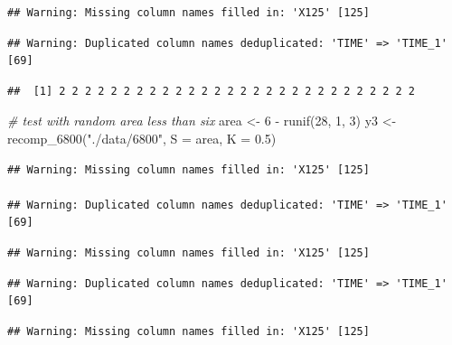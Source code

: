 \documentclass[
]{krantz}
\makeatletter
\newenvironment{Shaded}{\begin{snugshade}}{\end{snugshade}}
\newcommand{\AttributeTok}[1]{\textcolor[rgb]{0.77,0.63,0.00}{#1}}
\newcommand{\CommentTok}[1]{\textcolor[rgb]{0.56,0.35,0.01}{\textit{#1}}}
\newcommand{\DecValTok}[1]{\textcolor[rgb]{0.00,0.00,0.81}{#1}}
\newcommand{\FloatTok}[1]{\textcolor[rgb]{0.00,0.00,0.81}{#1}}
\newcommand{\FunctionTok}[1]{\textcolor[rgb]{0.00,0.00,0.00}{#1}}
\newcommand{\NormalTok}[1]{#1}
\newcommand{\OtherTok}[1]{\textcolor[rgb]{0.56,0.35,0.01}{#1}}
\newcommand{\SpecialCharTok}[1]{\textcolor[rgb]{0.00,0.00,0.00}{#1}}
\newcommand{\StringTok}[1]{\textcolor[rgb]{0.31,0.60,0.02}{#1}}
\newenvironment{kframe}{%
\medskip{}
\setlength{\fboxsep}{.8em}
 \def\at@end@of@kframe{}%
 \ifinner\ifhmode%
  \def\at@end@of@kframe{\end{minipage}}%
  \begin{minipage}{\columnwidth}%
 \fi\fi%
 \def\FrameCommand##1{\hskip\@totalleftmargin \hskip-\fboxsep
 \colorbox{shadecolor}{##1}\hskip-\fboxsep
     \hskip-\linewidth \hskip-\@totalleftmargin \hskip\columnwidth}%
 \MakeFramed {\advance\hsize-\width
   \@totalleftmargin\z@ \linewidth\hsize
   \@setminipage}}%
 {\par\unskip\endMakeFramed%
 \at@end@of@kframe}
\renewenvironment{Shaded}{\begin{kframe}}{\end{kframe}}
\makeatother
\begin{document}
\begin{verbatim}
## Warning: Missing column names filled in: 'X125' [125]
\end{verbatim}

\begin{verbatim}
## Warning: Duplicated column names deduplicated: 'TIME' => 'TIME_1' [69]
\end{verbatim}

\begin{Shaded}
\end{Shaded}

\begin{verbatim}
##  [1] 2 2 2 2 2 2 2 2 2 2 2 2 2 2 2 2 2 2 2 2 2 2 2 2 2 2 2 2
\end{verbatim}

\begin{Shaded}
\begin{Highlighting}[]
\CommentTok{\# test with random area less than six}
\NormalTok{area }\OtherTok{\textless{}{-}} \DecValTok{6} \SpecialCharTok{{-}} \FunctionTok{runif}\NormalTok{(}\DecValTok{28}\NormalTok{, }\DecValTok{1}\NormalTok{, }\DecValTok{3}\NormalTok{)}
\NormalTok{y3 }\OtherTok{\textless{}{-}} \FunctionTok{recomp\_6800}\NormalTok{(}\StringTok{"./data/6800"}\NormalTok{, }\AttributeTok{S =}\NormalTok{ area, }\AttributeTok{K =} \FloatTok{0.5}\NormalTok{)}
\end{Highlighting}
\end{Shaded}

\begin{verbatim}
## Warning: Missing column names filled in: 'X125' [125]

## Warning: Duplicated column names deduplicated: 'TIME' => 'TIME_1' [69]
\end{verbatim}

\begin{verbatim}
## Warning: Missing column names filled in: 'X125' [125]
\end{verbatim}

\begin{verbatim}
## Warning: Duplicated column names deduplicated: 'TIME' => 'TIME_1' [69]
\end{verbatim}

\begin{verbatim}
## Warning: Missing column names filled in: 'X125' [125]
\end{verbatim}
\end{document}
